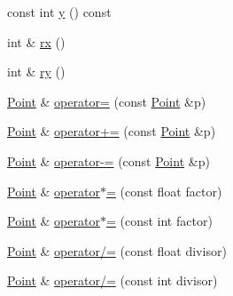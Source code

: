 \begin{DoxyCompactItemize}
const int \hyperlink{classprism_1_1_point_ac3283efaa56d37b9d69b7ff5e9d5c2f4}{y} () const 
\item 
int \& \hyperlink{classprism_1_1_point_abcbcac675e56f63e69d7fc165fd66106}{rx} ()
\item 
int \& \hyperlink{classprism_1_1_point_a380a0a615af10ec2392a472ca11325d7}{ry} ()
\item 
\hyperlink{classprism_1_1_point}{Point} \& \hyperlink{classprism_1_1_point_a7e3386be01e28ac9db673c91384a0d53}{operator=} (const \hyperlink{classprism_1_1_point}{Point} \&p)
\item 
\hyperlink{classprism_1_1_point}{Point} \& \hyperlink{classprism_1_1_point_a3df2e80f1554f772e14d1b4ecc55e4a9}{operator+=} (const \hyperlink{classprism_1_1_point}{Point} \&p)
\item 
\hyperlink{classprism_1_1_point}{Point} \& \hyperlink{classprism_1_1_point_a6d407a4ac17b13e941b31519d5f7a8a3}{operator-\/=} (const \hyperlink{classprism_1_1_point}{Point} \&p)
\item 
\hyperlink{classprism_1_1_point}{Point} \& \hyperlink{classprism_1_1_point_a170f9053e8e7c3319c86de5af5843ee4}{operator$\ast$=} (const float factor)
\item 
\hyperlink{classprism_1_1_point}{Point} \& \hyperlink{classprism_1_1_point_ab036f1dc222dd33a580df59a4170f60f}{operator$\ast$=} (const int factor)
\item 
\hyperlink{classprism_1_1_point}{Point} \& \hyperlink{classprism_1_1_point_a6b5e3e019f8cf484d372fc355e6c7a64}{operator/=} (const float divisor)
\item 
\hyperlink{classprism_1_1_point}{Point} \& \hyperlink{classprism_1_1_point_a6d152f61b02e2a62b356627079c15089}{operator/=} (const int divisor)
\end{DoxyCompactItemize}
